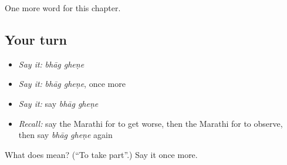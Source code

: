 \begin{grammarlens}[title={What you've built}]
One more word for this chapter.
\end{grammarlens}

\subsection*{Your turn}
\begin{itemize}
\raggedright
  \item \emph{Say it:} \emph{bhāg gheṇe}
  \item \emph{Say it:} \emph{bhāg gheṇe}, once more
  \item \emph{Say it:} say \emph{bhāg gheṇe}
  \item \emph{Recall:} say the Marathi for to get worse, then the Marathi for to observe, then say \emph{bhāg gheṇe} again
\end{itemize}

\begin{tcolorbox}[breakable,colback=teal!4,colframe=teal!35!black,title={Before you move on}]
What does   mean? (\textquotedblleft{}To take part\textquotedblright{}.) Say it once more.
\end{tcolorbox}
